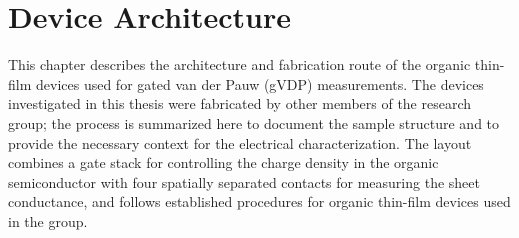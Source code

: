 \chapter{Device Architecture}
\thispagestyle{plain}

This chapter describes the architecture and fabrication route of the organic thin-film devices used for gated van der Pauw (gVDP) measurements. The devices investigated in this thesis were fabricated by other members of the research group; the process is summarized here to document the sample structure and to provide the necessary context for the electrical characterization. The layout combines a gate stack for controlling the charge density in the organic semiconductor with four spatially separated contacts for measuring the sheet conductance, and follows established procedures for organic thin-film devices used in the group.






